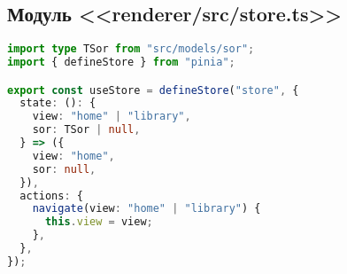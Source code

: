 \subsection{Модуль <<renderer/src/store.ts>>}
\begin{lstlisting}[language=typescript]
import type TSor from "src/models/sor";
import { defineStore } from "pinia";

export const useStore = defineStore("store", {
  state: (): {
    view: "home" | "library",
    sor: TSor | null,
  } => ({
    view: "home",
    sor: null,
  }),
  actions: {
    navigate(view: "home" | "library") {
      this.view = view;
    },
  },
});  
\end{lstlisting}
